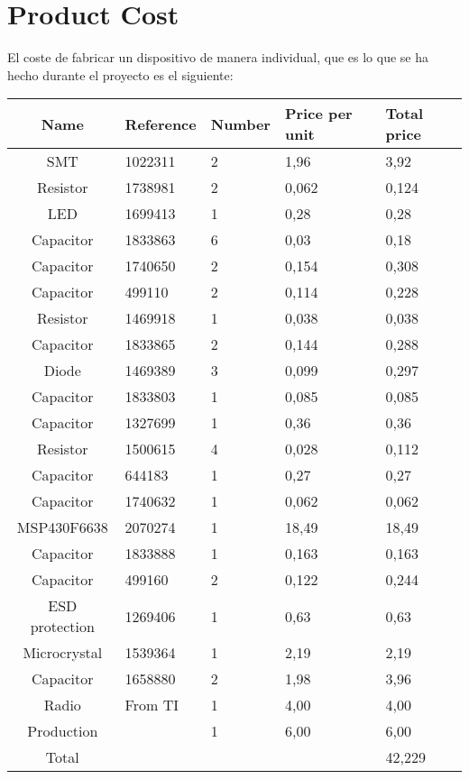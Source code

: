 \chapter{Product Cost}
\label{ch:cost}

	El coste de fabricar un dispositivo de manera individual, que es lo que se ha hecho durante el proyecto es el siguiente:\\

\begin{tabular}{| c |l | l | l | l |} 
	\hline
		Name & Reference & Number & Price per unit & Total price\\ \hline
		SMT & 1022311 & 2 & 1,96 & 3,92\\ \hline
		Resistor & 1738981 & 2 & 0,062 & 0,124\\ \hline
		LED & 1699413 & 1 & 0,28 & 0,28\\ \hline
		Capacitor & 1833863 & 6 & 0,03 & 0,18\\ \hline
		Capacitor & 1740650 & 2 & 0,154 & 0,308\\ \hline
		Capacitor & 499110 & 2 & 0,114 & 0,228\\ \hline
		Resistor & 1469918 & 1 & 0,038 & 0,038\\ \hline
		Capacitor & 1833865 & 2 & 0,144 & 0,288\\ \hline
		Diode & 1469389 & 3 & 0,099 & 0,297\\ \hline
	   	Capacitor & 1833803 & 1 & 0,085 & 0,085\\ \hline
 		Capacitor & 1327699 & 1 & 0,36 & 0,36 \\ \hline
  		Resistor & 1500615 & 4 & 0,028 & 0,112\\ \hline
	 	Capacitor & 644183 & 1 & 0,27 & 0,27 \\ \hline
	 	Capacitor & 1740632 & 1 & 0,062 & 0,062\\ \hline
	 	MSP430F6638 & 2070274 & 1 & 18,49 & 18,49\\ \hline
	 	Capacitor & 1833888 & 1 & 0,163 & 0,163\\ \hline
	 	Capacitor & 499160 & 2 & 0,122 & 0,244\\ \hline
	 	ESD protection & 1269406 & 1 & 0,63 & 0,63\\ \hline
	 	Microcrystal & 1539364 & 1 & 2,19 & 2,19\\ \hline
	 	Capacitor & 1658880 & 2 & 1,98 & 3,96\\ \hline
	 	Radio & From TI & 1 & 4,00 & 4,00\\ \hline
		Production & & 1 & 6,00 & 6,00\\ \hline
	 	Total &  &  &  & 42,229\\ \hline
	\hline
\end{tabular}\\\\

